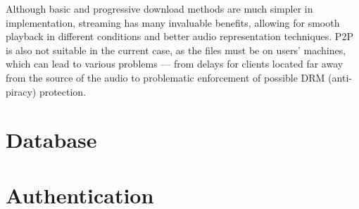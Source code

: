 Although basic and progressive download methods are much simpler in implementation,
streaming has many invaluable benefits, allowing for smooth playback in different
conditions and better audio representation techniques. P2P is also not suitable
in the current case, as the files must be on users' machines, which can lead
to various problems — from delays for clients located far away from the source of the audio
to problematic enforcement of possible DRM (anti-piracy) protection.


\section{Database}


\section{Authentication}

